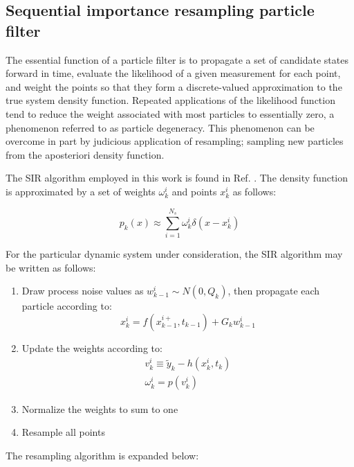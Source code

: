 \documentclass[]{article}
\begin{document}
\subsection{Sequential importance resampling particle filter}

The essential function of a particle filter is to propagate a set of candidate states forward in time, evaluate the likelihood of a given measurement for each point, and weight the points so that they form a discrete-valued approximation to the true system density function. Repeated applications of the likelihood function tend to reduce the weight associated with most particles to essentially zero, a phenomenon referred to as particle degeneracy. This phenomenon can be overcome in part by judicious application of resampling; sampling new particles from the aposteriori density function.

The SIR algorithm employed in this work is found in Ref. \cite{arulampalam}. The density function is approximated by a set of weights $\omega^{i}_k$ and points $x^{i}_k$ as follows:

\begin{equation}
p_k(x) \approx \sum_{i=1}^{N_s} \omega^{i}_k \delta(x-x^{i}_k)
\end{equation}

For the particular dynamic system under consideration, the SIR algorithm may be written as follows:

\begin{enumerate}
\item Draw process noise values as $w^i_{k-1} \sim N(0,Q_k)$, then propagate each particle according to:
\begin{equation}
x_k^{i} = f(x_{k-1}^{i+},t_{k-1}) + G_k w^i_{k-1}
\label{eq:pf_eqom}
\end{equation}
\item Update the weights according to:
\begin{align}
v_k^i \equiv \tilde{y}_k - h(x_k^i,t_k) \\
\omega_k^i = p(v_k^i)
\end{align}
\item Normalize the weights to sum to one
\item Resample all points
\end{enumerate}

The resampling algorithm is expanded below:
\end{document}
